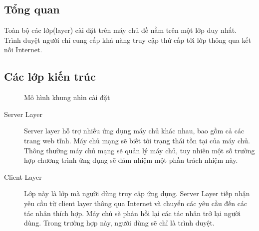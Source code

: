 \documentclass[./../main_file.tex]{subfiles}
\begin{document}
	\subsection{Tổng quan}
	Toàn bộ các lớp(layer) cài đặt trên máy chủ đề nằm trên một lớp duy nhất. Trình duyệt người chỉ cung cấp khả năng truy cập thứ cấp tới lớp thông qua kết nối Internet.
	\subsection{Các lớp kiến trúc}
	\begin{figure}[H]
		\centering
		\resizebox{0.8\textwidth}{!}{}
		\caption{Mô hình khung nhìn cài đặt}
	\end{figure}
	\begin{description}
		\item[Server Layer] Server layer hỗ trợ nhiều ứng dụng máy chủ khác nhau, bao gồm cả các trang web tĩnh. Máy chủ mạng sẽ biết tới trạng thái tồn tại của máy chủ. Thông thường máy chủ mạng sẽ quản lý máy chủ, tuy nhiên một số trường hợp chương trình ứng dụng sẽ đảm nhiệm một phần trách nhiệm này.
		
		\item[Client Layer] Lớp này là lớp mà người dùng truy cập ứng dụng. Server Layer tiếp nhận yêu cầu từ client layer thông qua Internet và chuyển các yêu cầu đến các tác nhân thích hợp. Máy chủ sẽ phản hồi lại các tác nhân trở lại  người dùng. Trong trường hợp này, người dùng sẽ chỉ là trình duyệt. 
		
	\end{description}
	
\end{document}
